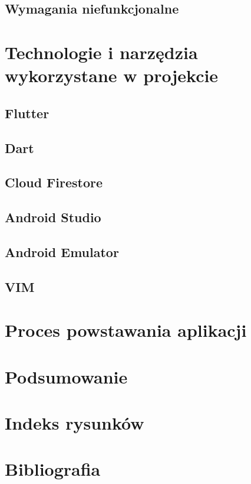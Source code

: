 \documentclass[12pt, a4paper]{article}
\begin{document}
\begin{sloppypar}
{{  }
  \subsection{Wymagania niefunkcjonalne}
  {

  }
}

\section{Technologie i narzędzia wykorzystane w projekcie}
{
  \subsection{Flutter}
  {

  }
  \subsection{Dart}
  {

  }
  \subsection{Cloud Firestore}
  {

  }
  \subsection{Android Studio}
  {

  }
  \subsection{Android Emulator}
  {

  }
  \subsection{VIM}
  {

  }
}

\section{Proces powstawania aplikacji}
{
}

\section{Podsumowanie}
{
}

\section{Indeks rysunków}

\section{Bibliografia}
{
  \printbibliography
}

\end{sloppypar}
\end{document}

